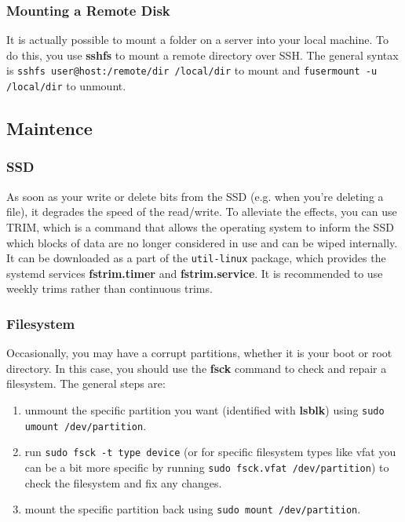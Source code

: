 \documentclass{article}
\theoremstyle{definition}
\begin{document}
    \subsubsection{Mounting a Remote Disk} 

      It is actually possible to mount a folder on a server into your local machine. To do this, you use \textbf{sshfs} to mount a remote directory over SSH. The general syntax is \texttt{sshfs user@host:/remote/dir /local/dir} to mount and \texttt{fusermount -u /local/dir} to unmount. 

  \subsection{Maintence} 

    \subsubsection{SSD}

      As soon as your write or delete bits from the SSD (e.g. when you're deleting a file), it degrades the speed of the read/write. To alleviate the effects, you can use TRIM, which is a command that allows the operating system to inform the SSD which blocks of data are no longer considered in use and can be wiped internally. It can be downloaded as a part of the \texttt{util-linux} package, which provides the systemd services \textbf{fstrim.timer} and \textbf{fstrim.service}. It is recommended to use weekly trims rather than continuous trims. 

    \subsubsection{Filesystem} 

      Occasionally, you may have a corrupt partitions, whether it is your boot or root directory. In this case, you should use the \textbf{fsck} command to check and repair a filesystem. The general steps are: 
      \begin{enumerate} 
        \item unmount the specific partition you want (identified with \textbf{lsblk}) using \texttt{sudo umount /dev/partition}. 
        \item run \texttt{sudo fsck -t type device} (or for specific filesystem types like vfat you can be a bit more specific by running \texttt{sudo fsck.vfat /dev/partition}) to check the filesystem and fix any changes. 
        \item mount the specific partition back using \texttt{sudo mount /dev/partition}. 
      \end{enumerate}
\end{document}

